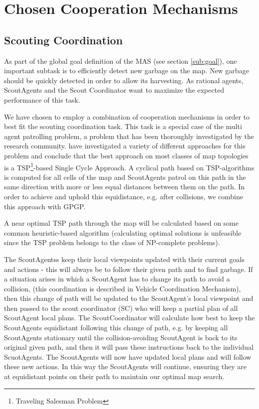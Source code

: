 \section{Chosen Cooperation Mechanisms}
\label{sec:chosCoop}


\subsection{Scouting Coordination}

As part of the global goal definition of the MAS (see section \ref{sub:goal}), one important subtask is to efficiently detect new garbage on the map. New garbage should be quickly detected in order to allow its harvesting. As rational agents, ScoutAgents and the Scout Coordinator want to maximize the expected performance of this task.

We have chosen to employ a combination of cooperation mechanisms in order to best fit the scouting coordination task. This task is a special case of the multi agent patrolling problem, a problem that has been thoroughly investigated by the research community. \cite{Almeida2004} have investigated a variety of different approaches for this problem and conclude that the best approach on most classes of map topologies is a TSP\footnote{Traveling Salesman Problem}-based Single Cycle Approach. A cyclical path based on TSP-algorithms is computed for all cells of the map and ScoutAgents patrol on this path in the same direction with more or less equal distances between them on the path. In order to achieve and uphold this equidistance, e.g. after collisions, we combine this approach with GPGP.

A near optimal TSP path through the map will be calculated based on some common heuristic-based algorithm (calculating optimal solutions is unfeasible since the TSP problem belongs to the class of NP-complete problems).  


The ScoutAgentss keep their local viewpoints updated with their current goals and actions - this will always be to follow their given path and to find garbage. If a situation arises in which a ScoutAgent has to change its path to avoid a collision, (this coordination is described in Vehicle Coordination Mechanism), then this change of path will be updated to the ScoutAgent’s local viewpoint and then passed to the scout coordinator (SC) who will keep a partial plan of all ScoutAgent local plans. The ScoutCoordinator will calculate how best to keep the ScoutAgents equidistant following this change of path, e.g. by keeping all ScoutAgents stationary until the collision-avoiding ScoutAgent is back to its original given path, and then it will pass these instructions back to the individual ScuotAgents. The ScoutAgents will now have updated local plans and will follow these new actions. In this way the ScoutAgents will continue, ensuring they are at equidistant points on their path to maintain our optimal map search. 


